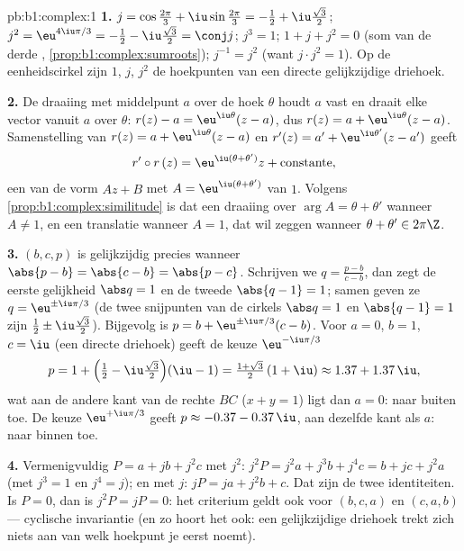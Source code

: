 \begin{solution}{pb:b1:complex:1}
\textbf{1.} $j = \cos\frac{2\pi}3 + \iu\sin\frac{2\pi}3 = -\frac12 +
\iu\frac{\sqrt3}2$; $j^2 = \eu^{4\iu\pi/3} = -\frac12 -
\iu\frac{\sqrt3}2 = \conj j$; $j^3 = 1$; $1 + j + j^2 = 0$ (som van de
derde , \cref{prop:b1:complex:sumroots}); $j^{-1} = j^2$
(want $j \cdot j^2 = 1$). Op de eenheidscirkel zijn $1$, $j$, $j^2$ de
hoekpunten van een directe gelijkzijdige driehoek.

\textbf{2.} De draaiing met middelpunt $a$ over de hoek $\theta$ houdt
$a$ vast en draait elke vector vanuit $a$ over $\theta$: $r(z) - a =
\eu^{\iu\theta}(z - a)$, dus $r(z) = a + \eu^{\iu\theta}(z - a)$.
Samenstelling van $r(z) = a + \eu^{\iu\theta}(z-a)$ en $r'(z) = a' +
\eu^{\iu\theta'}(z-a')$ geeft
\[
r' \circ r\,(z) = \eu^{\iu(\theta + \theta')} z +
\text{constante},
\]
een  van de vorm $Az + B$ met $A = \eu^{\iu(\theta+\theta')}$
van  $1$. Volgens \cref{prop:b1:complex:similitude} is dat een
draaiing over $\arg A = \theta + \theta'$ wanneer $A \neq 1$, en een
translatie wanneer $A = 1$, dat wil zeggen wanneer $\theta + \theta' \in
2\pi\Z$.

\textbf{3.} $(b, c, p)$ is gelijkzijdig precies wanneer $\abs{p - b} =
\abs{c - b} = \abs{p - c}$. Schrijven we $q = \frac{p - b}{c - b}$, dan
zegt de eerste gelijkheid $\abs q = 1$ en de tweede $\abs{q - 1} = 1$;
samen geven ze $q = \eu^{\pm\iu\pi/3}$ (de twee snijpunten van de cirkels
$\abs q = 1$ en $\abs{q - 1} = 1$ zijn $\frac12 \pm \iu\frac{\sqrt3}2$).
Bijgevolg is $p = b + \eu^{\pm\iu\pi/3}(c - b)$. Voor $a = 0$, $b = 1$,
$c = \iu$ (een directe driehoek) geeft de keuze $\eu^{-\iu\pi/3}$
\[
p = 1 + \Bigl(\tfrac12 - \iu\tfrac{\sqrt3}2\Bigr)(\iu - 1)
= \tfrac{1 + \sqrt3}2\,(1 + \iu) \approx 1.37 + 1.37\,\iu ,
\]
wat aan de andere kant van de rechte $BC$ ($x + y = 1$) ligt dan $a = 0$:
naar buiten toe. De keuze $\eu^{+\iu\pi/3}$ geeft $p \approx -0.37 -
0.37\,\iu$, aan dezelfde kant als $a$: naar binnen toe.

\textbf{4.} Vermenigvuldig $P = a + jb + j^2c$ met $j^2$: $j^2 P = j^2 a
+ j^3 b + j^4 c = b + jc + j^2 a$ (met $j^3 = 1$ en $j^4 = j$); en met
$j$: $jP = ja + j^2 b + c$. Dat zijn de twee identiteiten. Is $P = 0$,
dan is $j^2 P = jP = 0$: het criterium geldt ook voor $(b, c, a)$ en
$(c, a, b)$ --- cyclische invariantie (en zo hoort het ook: een
gelijkzijdige driehoek trekt zich niets aan van welk hoekpunt je eerst
noemt).


\end{solution}
